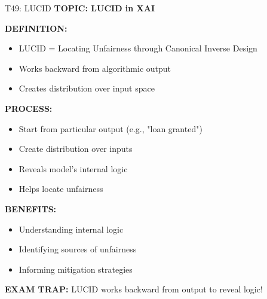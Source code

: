 \documentclass[8pt]{beamer}
\begin{document}
	\begin{frame}{T49: LUCID}
		\fontsize{6.5}{7.5}\selectfont
		\textbf{TOPIC: LUCID in XAI}
		
		\vspace{0.1cm}
		\textbf{DEFINITION:}
		\begin{itemize}
			\item LUCID = Locating Unfairness through Canonical Inverse Design
			\item Works backward from algorithmic output
			\item Creates distribution over input space
		\end{itemize}
		
		\vspace{0.1cm}
		\textbf{PROCESS:}
		\begin{itemize}
			\item Start from particular output (e.g., "loan granted")
			\item Create distribution over inputs
			\item Reveals model's internal logic
			\item Helps locate unfairness
		\end{itemize}
		
		\vspace{0.1cm}
		\textbf{BENEFITS:}
		\begin{itemize}
			\item Understanding internal logic
			\item Identifying sources of unfairness
			\item Informing mitigation strategies
		\end{itemize}
		
		\textcolor{myred}{\textbf{EXAM TRAP:}} LUCID works \textcolor{myblue}{backward from output to reveal logic}!
	\end{frame}
	
\end{document}
